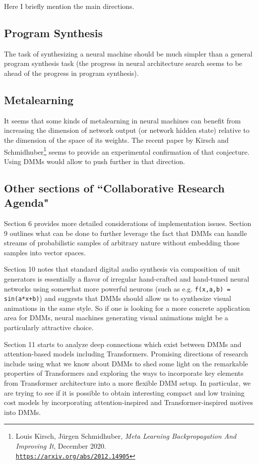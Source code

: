 \documentclass{article}
\begin{document}
Here I briefly mention the main directions.

\subsection{Program Synthesis}

The task of synthesizing a neural machine should be much simpler than a general program synthesis task
(the progress in neural architecture search seems to be ahead of the progress in program synthesis).

\subsection{Metalearning}

It seems that some kinds of metalearning in neural machines can benefit from increasing the dimension of
network output (or network hidden state) relative to the dimension of the space of its weights. The recent
paper by Kirsch and Schmidhuber\footnote{Louis Kirsch, Jürgen Schmidhuber,
{\em Meta Learning Backpropagation And Improving It}, December 2020.\\
\href{https://arxiv.org/abs/2012.14905}{\tt https://arxiv.org/abs/2012.14905}} seems to provide
an experimental confirmation of that conjecture. Using DMMs would allow to push further in that direction. 

\subsection{Other sections of ``Collaborative Research Agenda"}

Section 6 provides more detailed considerations of implementation issues. Section 9 outlines
what can be done to further leverage the fact that DMMs can handle streams of probabilistic
samples of arbitrary nature without embedding those samples into vector spaces. 

Section 10 notes that standard digital audio synthesis via composition of unit generators is essentially
a flavor of irregular hand-crafted and hand-tuned neural networks using somewhat more powerful
neurons (such as e.g. {\tt f(x,a,b) = sin(a*x+b)}) and suggests that DMMs should allow us to synthesize visual animations in the same style.
So if one is looking for a more concrete application area for DMMs, neural machines generating
visual animations might be a particularly attractive choice.

Section 11 starts to analyze deep connections which exist between DMMs and attention-based models including
Transformers. Promising directions of research include using what we know about DMMs to
shed some light on the remarkable properties of Transformers and exploring the ways to incorporate key elements from Transformer architecture into a more flexible DMM setup. In particular, we are trying to see
if it is possible to obtain interesting compact and low training cost models by 
incorporating attention-inspired and Transformer-inspired motives into DMMs.
\end{document}
